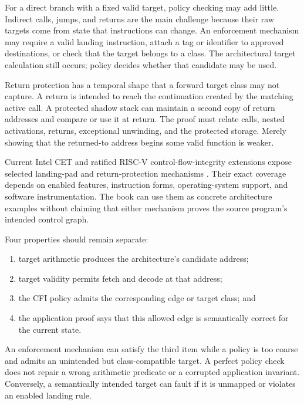 For a direct branch with a fixed valid target, policy checking may add little.
Indirect calls, jumps, and returns are the main challenge because their raw
targets come from state that instructions can change. An enforcement mechanism may require a valid
landing instruction, attach a tag or identifier to approved destinations, or
check that the target belongs to a class. The architectural target calculation
still occurs; policy decides whether that candidate may be used.

Return protection has a temporal shape that a forward target class may not
capture. A return is intended to reach the continuation created by the matching
active call. A protected shadow stack can maintain a second copy of return
addresses and compare or use it at return. The proof must relate calls, nested
activations, returns, exceptional unwinding, and the protected storage. Merely
showing that the returned-to address begins some valid function is weaker.

Current Intel CET and ratified RISC-V control-flow-integrity extensions expose
selected landing-pad and return-protection mechanisms
\autocite{intel2020cet,riscv2026cfi}. Their exact coverage depends on enabled
features, instruction forms, operating-system support, and software
instrumentation. The book can use them as concrete architecture examples
without claiming that either mechanism proves the source program's intended
control graph.

Four properties should remain separate:

\begin{enumerate}
\item target arithmetic produces the architecture's candidate address;
\item target validity permits fetch and decode at that address;
\item the CFI policy admits the corresponding edge or target class; and
\item the application proof says that this allowed edge is semantically
correct for the current state.
\end{enumerate}

An enforcement mechanism can satisfy the third item while a policy is too
coarse and admits an unintended but class-compatible target. A perfect policy
check does not repair a wrong arithmetic predicate or a corrupted application
invariant. Conversely, a semantically intended target can fault if it is
unmapped or violates an enabled landing rule.

